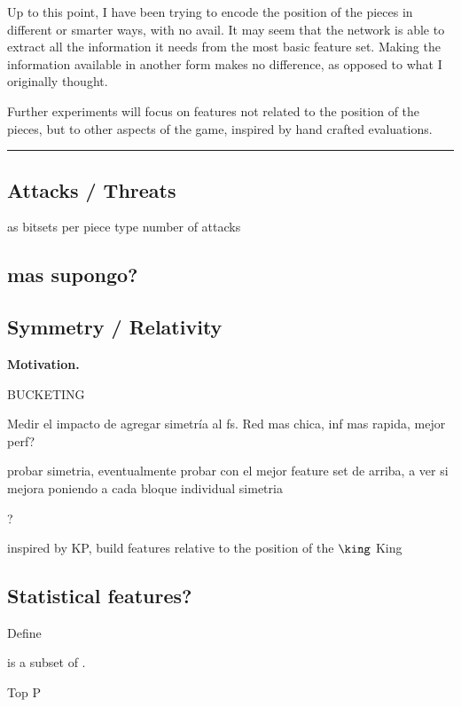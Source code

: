 \vspace{0.2cm}
Up to this point, I have been trying to encode the position of the pieces in different or smarter ways, with no avail. It may seem that the network is able to extract all the information it needs from the most basic  feature set. Making the information available in another form makes no difference, as opposed to what I originally thought.

Further experiments will focus on features not related to the position of the pieces, but to other aspects of the game, inspired by hand crafted evaluations.

\noindent\rule{\textwidth}{1pt}



\subsection{Attacks / Threats}

as bitsets per piece type
number of attacks

\subsection{mas supongo?}

\subsection{Symmetry / Relativity}

\textbf{Motivation.}

BUCKETING

Medir el impacto de agregar simetría al fs. Red mas chica, inf mas rapida, mejor perf?

probar simetria, eventualmente probar con el mejor feature set de arriba, a ver si mejora poniendo a cada bloque individual simetria

?

inspired by KP, build features relative to the position of the $\king$ King

\subsection{Statistical features?}

Define 

 is a subset of .

Top P

